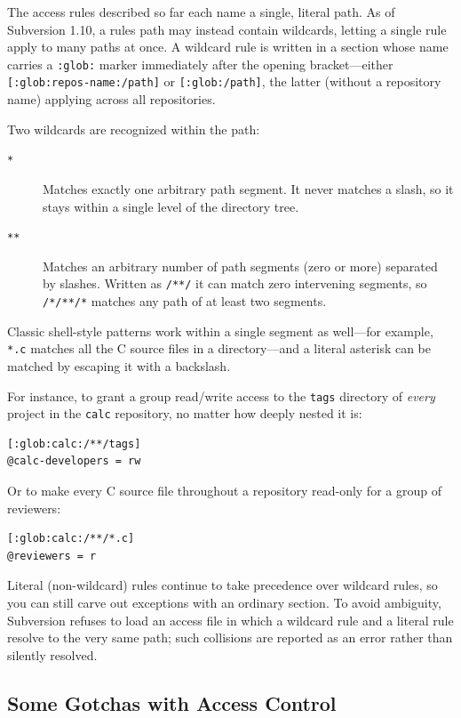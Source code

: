 The access rules described so far each name a single, literal path. As of
Subversion 1.10, a rule\textquotesingle s path may instead contain
wildcards, letting a single rule apply to many paths at once. A wildcard
rule is written in a section whose name carries a \texttt{:glob:} marker
immediately after the opening bracket---either
\texttt{{[}:glob:repos-name:/path{]}} or \texttt{{[}:glob:/path{]}}, the
latter (without a repository name) applying across all repositories.

Two wildcards are recognized within the path:

\begin{description}
\item[\texttt{*}]
Matches exactly one arbitrary path segment. It never matches a slash, so
it stays within a single level of the directory tree.
\item[\texttt{**}]
Matches an arbitrary number of path segments (zero or more) separated by
slashes. Written as \texttt{/**/} it can match zero intervening segments,
so \texttt{/*/**/*} matches any path of at least two segments.
\end{description}

Classic shell-style patterns work within a single segment as well---for
example, \texttt{*.c} matches all the C source files in a directory---and
a literal asterisk can be matched by escaping it with a backslash.

For instance, to grant a group read/write access to the \texttt{tags}
directory of \emph{every} project in the \texttt{calc} repository, no
matter how deeply nested it is:

\begin{verbatim}
[:glob:calc:/**/tags]
@calc-developers = rw
\end{verbatim}

Or to make every C source file throughout a repository read-only for a
group of reviewers:

\begin{verbatim}
[:glob:calc:/**/*.c]
@reviewers = r
\end{verbatim}

Literal (non-wildcard) rules continue to take precedence over wildcard
rules, so you can still carve out exceptions with an ordinary section. To
avoid ambiguity, Subversion refuses to load an access file in which a
wildcard rule and a literal rule resolve to the very same path; such
collisions are reported as an error rather than silently resolved.

\subsection{Some Gotchas with Access
Control}\label{svn.serverconfig.pathbasedauthz.gotchas}

